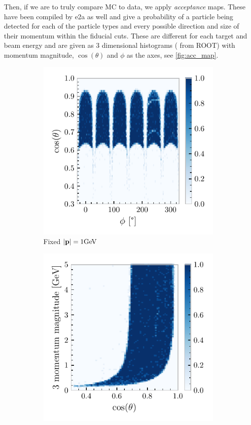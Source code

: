 \documentclass[a4paper,12pt]{article}
\newcommand{\verbb}[1]{\text{\verb|#1}}
\begin{document}
Then, if we are to truly compare MC to data, we apply \emph{acceptance} maps.
These have been compiled by e2a as well and give a probability of a particle being detected for each of the particle types and every possible direction and size of their momentum within the fiducial cuts.
These are different for each target and beam energy and are given as 3 dimensional histograms (\verbb{TH3F} from ROOT) with momentum magnitude, $\cos(\theta)$ and $\phi$ as the axes, see \cref{fig:acc_map}.

\begin{figure}[H]
    \centering
    \begin{subfigure}[b]{0.45\textwidth}
        \centering
        \includegraphics{figures/python/el_acc1.pdf}
        \caption{Fixed $|\vb{p}| = 1\si{GeV}$}
    \end{subfigure}
    \hspace{0.5em}
    \begin{subfigure}[b]{0.45\textwidth}
        \centering
        \includegraphics{figures/python/el_acc2.pdf}

\end{subfigure}
\end{figure}
\end{document}
